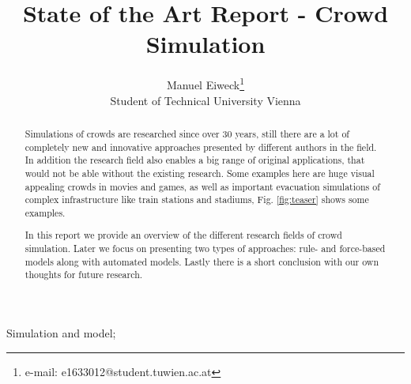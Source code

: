\documentclass{acmsiggraph}               %
\title{State of the Art Report - Crowd Simulation}
\author{Manuel Eiweck\thanks{e-mail: e1633012@student.tuwien.ac.at}\\ Student of Technical University Vienna}
\begin{document}


\maketitle


\begin{abstract}
Simulations of crowds are researched since over 30 years, still there are a lot of completely new and innovative approaches presented by different authors in the field. In addition the research field also enables a big range of original applications, that would not be able without the existing research. Some examples here are huge visual appealing crowds in movies and games, as well as important evacuation simulations of complex infrastructure like train stations and stadiums, Fig. \ref{fig:teaser} shows some examples.

In this report we provide an overview of the different research fields of crowd simulation. Later we focus on presenting two types of approaches: rule- and force-based models along with automated models. Lastly there is a short conclusion with our own thoughts for future research.

\end{abstract}


\begin{CRcatlist}
{Simulation and model}{};
\end{CRcatlist}
\end{document}
